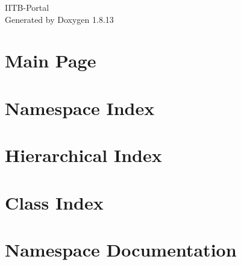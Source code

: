 \documentclass[twoside]{book}
\newcommand{\+}{\discretionary{\mbox{\scriptsize$\hookleftarrow$}}{}{}}
\newcommand{\clearemptydoublepage}{%
  \newpage{\pagestyle{empty}\cleardoublepage}%
}
\begin{document}
\hypersetup{pageanchor=false,
             bookmarksnumbered=true,
             pdfencoding=unicode
            }
\begin{titlepage}
\vspace*{7cm}
\begin{center}%
{\Large I\+I\+T\+B-\/\+Portal }\\
\vspace*{1cm}
{\large Generated by Doxygen 1.8.13}\\
\end{center}
\end{titlepage}
\clearemptydoublepage
{}
\tableofcontents
\clearemptydoublepage
{}
\hypersetup{pageanchor=true}

\chapter{Main Page}
\label{index}\hypertarget{index}{}
\chapter{Namespace Index}

\chapter{Hierarchical Index}

\chapter{Class Index}

\chapter{Namespace Documentation}



\end{document}
